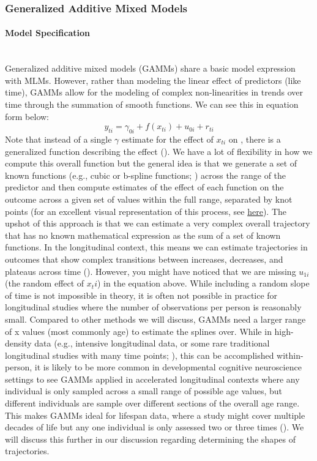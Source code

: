 \documentclass[11pt]{article}
\newcommand{\subsubsubsection}[1]{\paragraph{#1}\mbox{}\\}  %
\begin{document}
\subsubsection{Generalized Additive Mixed Models} \label{gamms}
\subsubsubsection{Model Specification}
Generalized additive mixed models (GAMMs) share a basic model expression with MLMs. However, rather than modeling the linear effect of predictors (like time), GAMMs allow for the modeling of complex non-linearities in trends over time through the summation of smooth functions. We can see this in equation form below:
%
\begin{equation} \label{eq:5}
y_{ti} = \gamma_{0i} + f(x_{ti}) + u_{0i} + r_{ti}
\end{equation}
%
Note that instead of a single $\gamma$ estimate for the effect of $x_{ti}$ on  , there is a generalized function describing the effect (\cite{hastie_generalized_1987,lin_inference_1999}). We have a lot of flexibility in how we compute this overall function but the general idea is that we generate a set of known functions (e.g., cubic or b-spline functions; \cite{eilers_flexible_1996,wood_thin_2003}) across the range of the predictor and then compute estimates of the effect of each function on the outcome across a given set of values within the full range, separated by knot points (for an excellent visual representation of this process, see \href{https://m-clark.github.io/generalized-additive-models/technical.html#a-detailed-example}{here}). The upshot of this approach is that we can estimate a very complex overall trajectory that has no known mathematical expression as the sum of a set of known functions. In the longitudinal context, this means we can estimate trajectories in outcomes that show complex transitions between increases, decreases, and plateaus across time (\cite{sorensen_recipe_2021,sorensen_meta-analysis_2021}). However, you might have noticed that we are missing $u_{1i}$ (the random effect of $x_ti$) in the equation above. While including a random slope of time is not impossible in theory, it is often not possible in practice for longitudinal studies where the number of observations per person is reasonably small. Compared to other methods we will discuss, GAMMs need a larger range of x values (most commonly age) to estimate the splines over. While in high-density data (e.g., intensive longitudinal data, or some rare traditional longitudinal studies with many time points; \cite{lambert_analysis_2001,sullivan_introduction_2015}), this can be accomplished within-person, it is likely to be more common in developmental cognitive neuroscience settings to see GAMMs applied in accelerated longitudinal contexts where any individual is only sampled across a small range of possible age values, but different individuals are sample over different sections of the overall age range. This makes GAMMs ideal for lifespan data, where a study might cover multiple decades of life but any one individual is only assessed two or three times (\cite{sorensen_recipe_2021}). We will discuss this further in our discussion regarding determining the shapes of trajectories.
\end{document}
